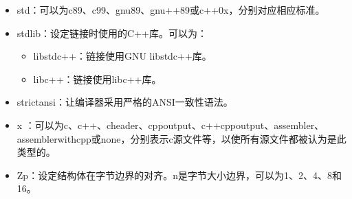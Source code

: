 \documentclass[a4paper,12pt,english]{sphinxmanual}
\begin{document}
\begin{itemize}
\item {} 
\sphinxAtStartPar
\sphinxhyphen{}std：可以为c89、c99、gnu89、gnu++89或c++0x，分别对应相应标准。

\item {} 
\sphinxAtStartPar
\sphinxhyphen{}stdlib\sphinxstyleemphasis{{[}=keyword{]}}：设定链接时使用的C++库。可以为：
\begin{itemize}
\item {} 
\sphinxAtStartPar
libstdc++：链接使用GNU libstdc++库。

\item {} 
\sphinxAtStartPar
libc++：链接使用libc++库。

\end{itemize}

\item {} 
\sphinxAtStartPar
\sphinxhyphen{}strict\sphinxhyphen{}ansi：让编译器采用严格的ANSI一致性语法。

\item {} 
\sphinxAtStartPar
\sphinxhyphen{}x ：可以为c、c++、c\sphinxhyphen{}header、cpp\sphinxhyphen{}output、c++\sphinxhyphen{}cpp\sphinxhyphen{}output、assembler、assembler\sphinxhyphen{}with\sphinxhyphen{}cpp或none，分别表示c源文件等，以使所有源文件都被认为是此类型的。

\item {} 
\sphinxAtStartPar
\sphinxhyphen{}Zp\sphinxstyleemphasis{{[}n{]}}：设定结构体在字节边界的对齐。n是字节大小边界，可以为1、2、4、8和16。

\end{itemize}
\end{document}

